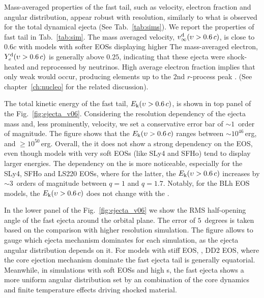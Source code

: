 Mass-averaged properties of the fast tail,  such as velocity, electron fraction and 
angular distribution, appear robust with resolution, similarly to what is observed for 
the total dynamical ejecta (See Tab.~\ref{tab:sims}).
We report the properties of fast tail in Tab.~\ref{tab:sim}.
%
The mass averaged velocity, $v^{\text{d}}_\infty(\upsilon>0.6\,c)$, is close to $0.6c$ with 
models with softer \acp{EOS} displaying higher
The mass-averaged electron, $Y^{\text{d}}_{e}(\upsilon>0.6\, c)$ is generally above $0.25$, 
indicating that these ejecta were shock-heated and reprocessed by neutrinos. High 
average electron fraction implies that only weak \rproc{} \nuc{} would 
occur, producing elements up to the $2$nd $r$-process peak \citep{Lippuner:2015gwa}. 
(See chapter~\ref{ch:nucleo} for the related discussion).

The total kinetic energy of the fast tail, $E_{\rm k}(\upsilon > 0.6\, c)$,
is shown in top panel of the Fig.~\ref{fig:ejecta_v06}.
Considering the resolution dependency of the ejecta mass and, less prominently, velocity, 
we set a conservative error bar of ${\sim}1$~order of magnitude.
%
The figure shows that the $E_{\rm k}(\upsilon > 0.6\, c)$ ranges between 
${\sim}10^{46}\,$erg, and ${\geq}10^{50}\,$erg. Overall, the it does not show a 
strong dependency on the \ac{EOS}, even though models with very soft \acp{EOS} 
(like SLy4 and SFHo) tend to display larger energies. 
The dependency on the \mr{} is more noticeable, especially for the 
SLy4, SFHo and LS220 \acp{EOS}, where for the latter, the $E_{\rm k}(\upsilon > 0.6\, c)$ 
increases by ${\sim3}\,$ orders of magnitude between $q=1$ and $q=1.7$. 
Notably, for the BLh \ac{EOS} models, the $E_{\rm k}(\upsilon > 0.6\, c)$
 does not change with the \mr{}.

In the lower panel of the Fig.~\ref{fig:ejecta_v06} we show the \ac{RMS} 
half-opening angle of the fast ejecta around the orbital plane. 
The error of $5$~degrees is taken based on the comparison with higher resolution
simulation. The figure allows to gauge which ejecta mechanism dominates for each 
simulation, as the ejecta angular distribution depends on it.
%
For models with stiff \ac{EOS}, \eg, DD2 \ac{EOS}, where the core \bnc{} 
ejection mechanism dominate the fast ejecta tail is generally equatorial.
Meanwhile, in simulations with soft \acp{EOS} and high \mr{}s, the fast ejecta shows 
a more uniform angular distribution set by an combination of the core dynamics and 
finite temperature effects driving shocked material.


